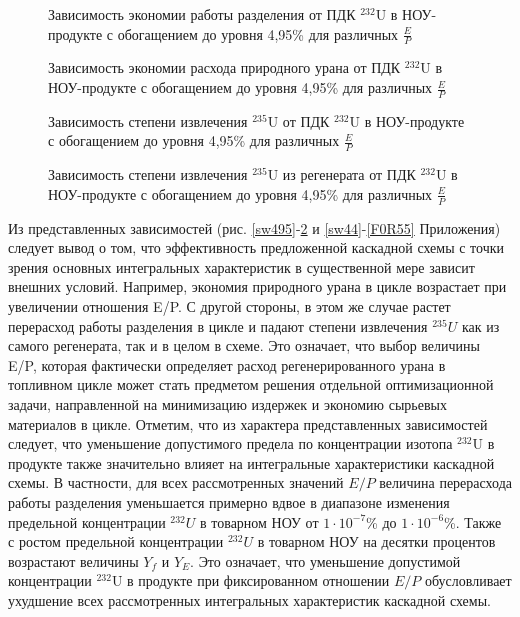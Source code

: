 \begin{figure}[ht]
    \centering
    \begin{minipage}{.5\textwidth}
      \centering
      
\caption{{Зависимость экономии работы разделения от ПДК $^{232}$U в НОУ-продукте с обогащением до уровня 4,95\% для различных $\frac{E}{P}${\label{sw495}}}}
    \end{minipage}%
    \begin{minipage}{.5\textwidth}
      \centering
      
    \caption{{Зависимость экономии расхода природного урана от ПДК $^{232}$U в НОУ-продукте с обогащением до уровня 4,95\% для различных $\frac{E}{P}${\label{F0R495}}}}
\end{minipage}
\end{figure}

\begin{figure}[ht]
    \centering
    \begin{minipage}{.5\textwidth}
      \centering
      
      \caption{{Зависимость степени извлечения $^{235}$U от ПДК $^{232}$U в НОУ-продукте с обогащением до уровня 4,95\% для различных $\frac{E}{P}${\label{ex495}}}}
    \end{minipage}%
    \begin{minipage}{.5\textwidth}
      \centering
      
      \caption{{Зависимость степени извлечения $^{235}$U из регенерата от ПДК $^{232}$U в НОУ-продукте с обогащением до уровня 4,95\% для различных $\frac{E}{P}${\label{exR495}}}}
\end{minipage}
\end{figure}

Из представленных зависимостей (рис. \ref{sw495}-\ref{exR495} и \ref{sw44}-\ref{F0R55} Приложения) следует вывод о том, что эффективность предложенной каскадной схемы с точки зрения основных интегральных характеристик в существенной мере зависит внешних условий. Например, экономия природного урана в цикле возрастает при увеличении отношения E/P. С другой стороны, в этом же случае растет перерасход работы разделения в цикле и падают степени извлечения $^{235}U$ как из самого регенерата, так и в целом в схеме. Это означает, что выбор величины E/P, которая фактически определяет расход регенерированного урана в топливном цикле может стать предметом решения отдельной оптимизационной задачи, направленной на минимизацию издержек и экономию сырьевых материалов в цикле. 
Отметим, что из характера представленных зависимостей следует, что уменьшение допустимого предела по концентрации изотопа $^{232}$U в продукте также значительно влияет на интегральные характеристики каскадной схемы. В частности, для всех рассмотренных значений $E/P$ величина перерасхода работы разделения уменьшается примерно вдвое в диапазоне изменения предельной концентрации $^{232}U$ в товарном НОУ от $1\cdot10^{-7}$\% до $1\cdot10^{-6}$\%. Также с ростом предельной концентрации $^{232}U$ в товарном НОУ на десятки процентов возрастают величины $Y_f$ и $Y_{E}$. Это означает, что уменьшение допустимой концентрации $^{232}$U в продукте при фиксированном отношении $E/P$ обусловливает ухудшение всех рассмотренных интегральных характеристик каскадной схемы. 


